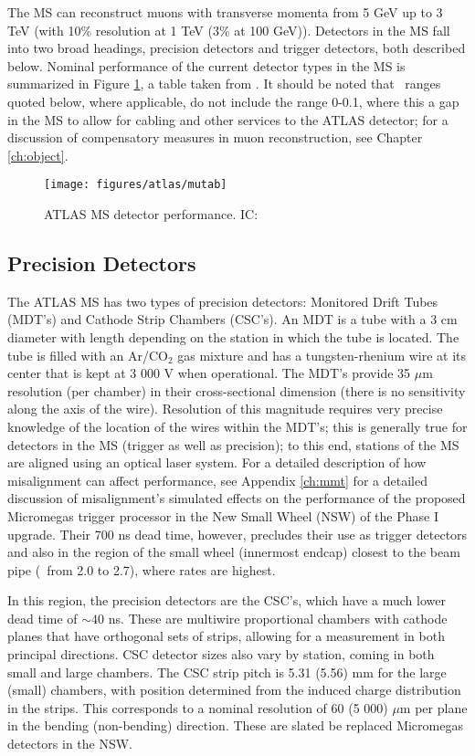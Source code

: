 The MS can reconstruct muons with transverse momenta from 5 GeV up to 3 TeV (with 10\% resolution at 1 TeV (3\% at 100 GeV)).  Detectors in the MS fall into two broad headings, precision detectors and trigger detectors, both described below.  Nominal performance of the current detector types in the MS is summarized in Figure \ref{fig:mutab}, a table taken from \cite{jinstpaper}.  It should be noted that \aeta\, ranges quoted below, where applicable, do not include the range 0-0.1, where this a gap in the MS to allow for cabling and other services to the ATLAS detector; for a discussion of compensatory measures in muon reconstruction, see Chapter \ref{ch:object}.

\begin{figure}[!htbp]\captionsetup{justification=centering}
  \centering
  \texttt{[image: figures/atlas/mutab]}
  \caption{ATLAS MS detector performance.  IC: \cite{jinstpaper}}
  \label{fig:mutab}
\end{figure}

\subsection{Precision Detectors}
The ATLAS MS has two types of precision detectors: Monitored Drift Tubes (MDT's) and Cathode Strip Chambers (CSC's).  An MDT is a tube with a 3 cm diameter with length depending on the station in which the tube is located.  The tube is filled with an Ar/CO$_2$ gas mixture and has a tungsten-rhenium wire at its center that is kept at 3 000 V when operational.  The MDT's provide 35 $\mu$m resolution (per chamber) in their cross-sectional dimension (there is no sensitivity along the axis of the wire).  Resolution of this magnitude requires very precise knowledge of the location of the wires within the MDT's; this is generally true for detectors in the MS (trigger as well as precision); to this end, stations of the MS are aligned using an optical laser system.  For a detailed description of how misalignment can affect performance, see Appendix \ref{ch:mmt} for a detailed discussion of misalignment's simulated effects on the performance of the proposed Micromegas trigger processor in the New Small Wheel (NSW) of the Phase I upgrade.  Their 700 ns dead time, however, precludes their use as trigger detectors and also in the region of the small wheel (innermost endcap) closest to the beam pipe (\aeta\, from 2.0 to 2.7), where rates are highest.

In this region, the precision detectors are the CSC's, which have a much lower dead time of $\sim40$ ns.  These are multiwire proportional chambers with cathode planes that have orthogonal sets of strips, allowing for a measurement in both principal directions.  CSC detector sizes also vary by station, coming in both small and large chambers.  The CSC strip pitch is 5.31 (5.56) mm for the large (small) chambers, with position determined from the induced charge distribution in the strips.  This corresponds to a nominal resolution of 60 (5 000) $\mu$m per plane in the bending (non-bending) direction.  These are slated be replaced Micromegas detectors in the NSW.

